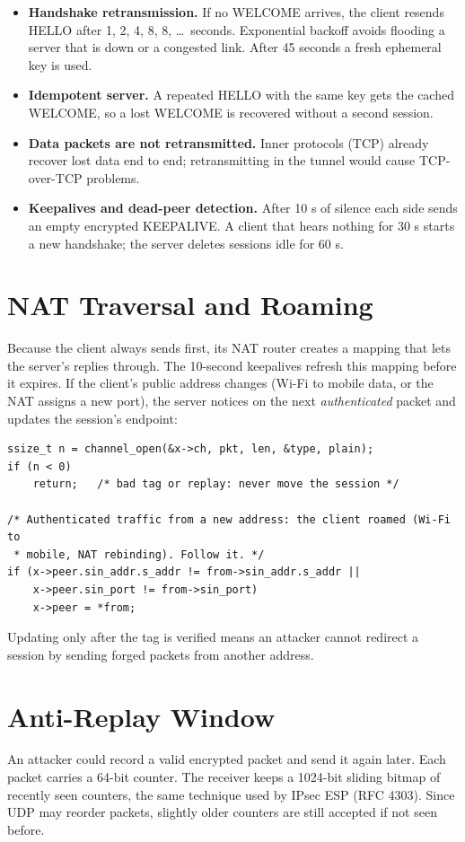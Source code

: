 \documentclass[12pt,a4paper]{report}
\begin{document}
\begin{itemize}
  \item \textbf{Handshake retransmission.} If no WELCOME arrives, the client resends HELLO
        after 1, 2, 4, 8, 8, \ldots\ seconds. Exponential backoff avoids flooding a server
        that is down or a congested link. After 45 seconds a fresh ephemeral key is used.
  \item \textbf{Idempotent server.} A repeated HELLO with the same key gets the cached
        WELCOME, so a lost WELCOME is recovered without a second session.
  \item \textbf{Data packets are not retransmitted.} Inner protocols (TCP) already recover
        lost data end to end; retransmitting in the tunnel would cause TCP-over-TCP problems.
  \item \textbf{Keepalives and dead-peer detection.} After 10 s of silence each side sends
        an empty encrypted KEEPALIVE. A client that hears nothing for 30 s starts a new
        handshake; the server deletes sessions idle for 60 s.
\end{itemize}

\section{NAT Traversal and Roaming}
Because the client always sends first, its NAT router creates a mapping that lets the
server's replies through. The 10-second keepalives refresh this mapping before it
expires. If the client's public address changes (Wi-Fi to mobile data, or the NAT
assigns a new port), the server notices on the next \emph{authenticated} packet and
updates the session's endpoint:

\begin{lstlisting}[caption={Roaming (\texttt{src/server.c})}]
ssize_t n = channel_open(&x->ch, pkt, len, &type, plain);
if (n < 0)
    return;   /* bad tag or replay: never move the session */

/* Authenticated traffic from a new address: the client roamed (Wi-Fi to
 * mobile, NAT rebinding). Follow it. */
if (x->peer.sin_addr.s_addr != from->sin_addr.s_addr ||
    x->peer.sin_port != from->sin_port)
    x->peer = *from;
\end{lstlisting}
Updating only after the tag is verified means an attacker cannot redirect a session by
sending forged packets from another address.

\section{Anti-Replay Window}
An attacker could record a valid encrypted packet and send it again later. Each packet
carries a 64-bit counter. The receiver keeps a 1024-bit sliding bitmap of recently seen
counters, the same technique used by IPsec ESP (RFC 4303). Since UDP may reorder
packets, slightly older counters are still accepted if not seen before.
\end{document}
